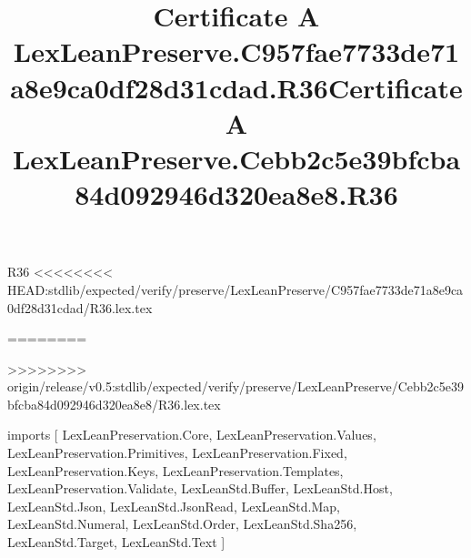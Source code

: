 \begin{lexlean}{R36}
<<<<<<<< HEAD:stdlib/expected/verify/preserve/LexLeanPreserve/C957fae7733de71a8e9ca0df28d31cdad/R36.lex.tex
\title{Certificate A LexLeanPreserve.C957fae7733de71a8e9ca0df28d31cdad.R36}
========
\title{Certificate A LexLeanPreserve.Cebb2c5e39bfcba84d092946d320ea8e8.R36}
>>>>>>>> origin/release/v0.5:stdlib/expected/verify/preserve/LexLeanPreserve/Cebb2c5e39bfcba84d092946d320ea8e8/R36.lex.tex
\begin{coremodule}
imports [
  LexLeanPreservation.Core,
  LexLeanPreservation.Values,
  LexLeanPreservation.Primitives,
  LexLeanPreservation.Fixed,
  LexLeanPreservation.Keys,
  LexLeanPreservation.Templates,
  LexLeanPreservation.Validate,
  LexLeanStd.Buffer,
  LexLeanStd.Host,
  LexLeanStd.Json,
  LexLeanStd.JsonRead,
  LexLeanStd.Map,
  LexLeanStd.Numeral,
  LexLeanStd.Order,
  LexLeanStd.Sha256,
  LexLeanStd.Target,
  LexLeanStd.Text
]


\end{coremodule}
\end{lexlean}
